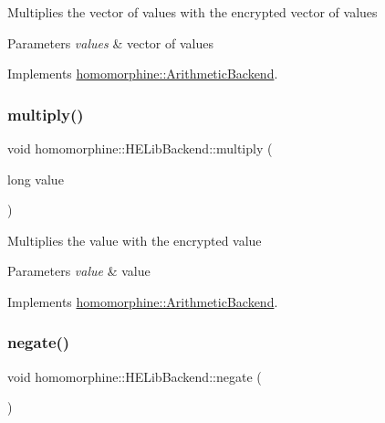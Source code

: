 Multiplies the vector of values with the encrypted vector of values


\begin{DoxyParams}{Parameters}
{\em values} & vector of values \\
\hline
\end{DoxyParams}


Implements \hyperlink{classhomomorphine_1_1_arithmetic_backend_a80f2424d26fcfad4803f6a0e5a9cdd2d}{homomorphine\+::\+Arithmetic\+Backend}.

\mbox{\label{classhomomorphine_1_1_h_e_lib_backend_a49d4e073eecc4759f12f60188a533835}} 
\subsubsection{\texorpdfstring{multiply()}{multiply()}\hspace{0.1cm}{\footnotesize\ttfamily [2/2]}}
{\footnotesize\ttfamily void homomorphine\+::\+H\+E\+Lib\+Backend\+::multiply (\begin{DoxyParamCaption}\item[{long}]{value }\end{DoxyParamCaption})\hspace{0.3cm}{\ttfamily [virtual]}}

Multiplies the value with the encrypted value


\begin{DoxyParams}{Parameters}
{\em value} & value \\
\hline
\end{DoxyParams}


Implements \hyperlink{classhomomorphine_1_1_arithmetic_backend_a22f4c598c5a3987ef6efe5925f4c5b81}{homomorphine\+::\+Arithmetic\+Backend}.

\mbox{\label{classhomomorphine_1_1_h_e_lib_backend_acb1ed456fa91fc1dfe878abb068f3f34}} 
\subsubsection{\texorpdfstring{negate()}{negate()}}
{\footnotesize\ttfamily void homomorphine\+::\+H\+E\+Lib\+Backend\+::negate (\begin{DoxyParamCaption}{ }\end{DoxyParamCaption})\hspace{0.3cm}{\ttfamily [virtual]}}

